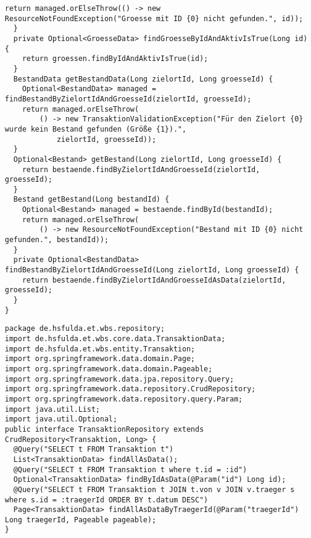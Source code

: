 \begin{lstlisting}[caption={Kontext und Abstraktion der Daten für die Erfassung von Transaktionen.}, label={lst:TransaktionContext}]
    return managed.orElseThrow(() -> new ResourceNotFoundException("Groesse mit ID {0} nicht gefunden.", id));
  }
  private Optional<GroesseData> findGroesseByIdAndAktivIsTrue(Long id) {
    return groessen.findByIdAndAktivIsTrue(id);
  }
  BestandData getBestandData(Long zielortId, Long groesseId) {
    Optional<BestandData> managed = findBestandByZielortIdAndGroesseId(zielortId, groesseId);
    return managed.orElseThrow(
        () -> new TransaktionValidationException("Für den Zielort {0} wurde kein Bestand gefunden (Größe {1}).",
            zielortId, groesseId));
  }
  Optional<Bestand> getBestand(Long zielortId, Long groesseId) {
    return bestaende.findByZielortIdAndGroesseId(zielortId, groesseId);
  }
  Bestand getBestand(Long bestandId) {
    Optional<Bestand> managed = bestaende.findById(bestandId);
    return managed.orElseThrow(
        () -> new ResourceNotFoundException("Bestand mit ID {0} nicht gefunden.", bestandId));
  }
  private Optional<BestandData> findBestandByZielortIdAndGroesseId(Long zielortId, Long groesseId) {
    return bestaende.findByZielortIdAndGroesseIdAsData(zielortId, groesseId);
  }
}
\end{lstlisting}

\begin{lstlisting}[caption={Repository in Stil von Spring für die Verwaltung von Transaktionen.}, label={lst:TransaktionRepository}]
package de.hsfulda.et.wbs.repository;
import de.hsfulda.et.wbs.core.data.TransaktionData;
import de.hsfulda.et.wbs.entity.Transaktion;
import org.springframework.data.domain.Page;
import org.springframework.data.domain.Pageable;
import org.springframework.data.jpa.repository.Query;
import org.springframework.data.repository.CrudRepository;
import org.springframework.data.repository.query.Param;
import java.util.List;
import java.util.Optional;
public interface TransaktionRepository extends CrudRepository<Transaktion, Long> {
  @Query("SELECT t FROM Transaktion t")
  List<TransaktionData> findAllAsData();
  @Query("SELECT t FROM Transaktion t where t.id = :id")
  Optional<TransaktionData> findByIdAsData(@Param("id") Long id);
  @Query("SELECT t FROM Transaktion t JOIN t.von v JOIN v.traeger s where s.id = :traegerId ORDER BY t.datum DESC")
  Page<TransaktionData> findAllAsDataByTraegerId(@Param("traegerId") Long traegerId, Pageable pageable);
}
\end{lstlisting}

